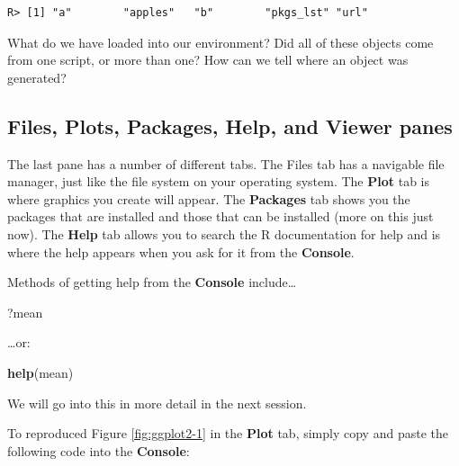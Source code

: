 \documentclass[
]{book}
\newenvironment{Shaded}{\begin{snugshade}}{\end{snugshade}}
\newcommand{\KeywordTok}[1]{\textcolor[rgb]{0.13,0.29,0.53}{\textbf{#1}}}
\newcommand{\NormalTok}[1]{#1}
\begin{document}
\begin{verbatim}
R> [1] "a"        "apples"   "b"        "pkgs_lst" "url"
\end{verbatim}

What do we have loaded into our environment? Did all of these objects come from one script, or more than one? How can we tell where an object was generated?

\hypertarget{files-plots-packages-help-and-viewer-panes}{%
\subsection{Files, Plots, Packages, Help, and Viewer panes}\label{files-plots-packages-help-and-viewer-panes}}

The last pane has a number of different tabs. The Files tab has a navigable file manager, just like the file system on your operating system. The \textbf{Plot} tab is where graphics you create will appear. The \textbf{Packages} tab shows you the packages that are installed and those that can be installed (more on this just now). The \textbf{Help} tab allows you to search the R documentation for help and is where the help appears when you ask for it from the \textbf{Console}.

Methods of getting help from the \textbf{Console} include\ldots{}

\begin{Shaded}
\begin{Highlighting}[]
\NormalTok{?mean}
\end{Highlighting}
\end{Shaded}

\ldots or:

\begin{Shaded}
\begin{Highlighting}[]
\KeywordTok{help}\NormalTok{(mean)}
\end{Highlighting}
\end{Shaded}

We will go into this in more detail in the next session.

To reproduced Figure \ref{fig:ggplot2-1} in the \textbf{Plot} tab, simply copy and paste the following code into the \textbf{Console}:
\end{document}
